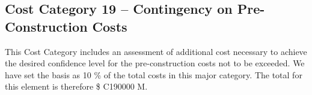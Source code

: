 \subsection*{Cost Category 19 – Contingency on Pre-Construction Costs}
This Cost Category includes an assessment of additional cost necessary to achieve the desired confidence level for the pre-construction costs not
to be exceeded. We have set the basis as 10 \% of the total costs in this major category. The total for this element is therefore \$ C190000 M.




